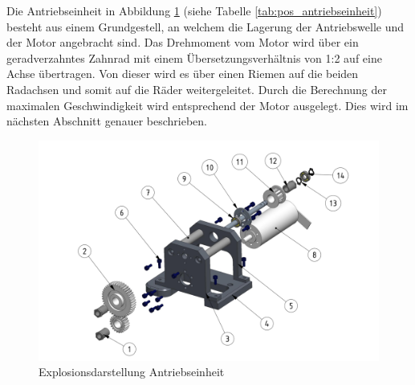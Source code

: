 \documentclass[../../main.tex]{subfiles}
\begin{document}
    \pagebreak

    Die Antriebseinheit in Abbildung \ref{fig:antriebseinheit} (siehe Tabelle \ref{tab:pos_antriebseinheit}) besteht aus einem Grundgestell, an welchem die Lagerung der Antriebswelle und der Motor angebracht sind. Das Drehmoment vom Motor wird über ein geradverzahntes Zahnrad mit einem Übersetzungsverhältnis von 1:2 auf eine Achse übertragen. Von dieser wird es über einen Riemen auf die beiden Radachsen und somit auf die Räder weitergeleitet. Durch die Berechnung der maximalen Geschwindigkeit wird entsprechend der Motor ausgelegt. Dies wird im nächsten Abschnitt genauer beschrieben.\\

    \begin{figure}[H] %
        \centering
        \includegraphics[width=1\textwidth]{antriebseinheit.png}
        \caption{Explosionsdarstellung Antriebseinheit}
        \label{fig:antriebseinheit}
    \end{figure}
\end{document}
